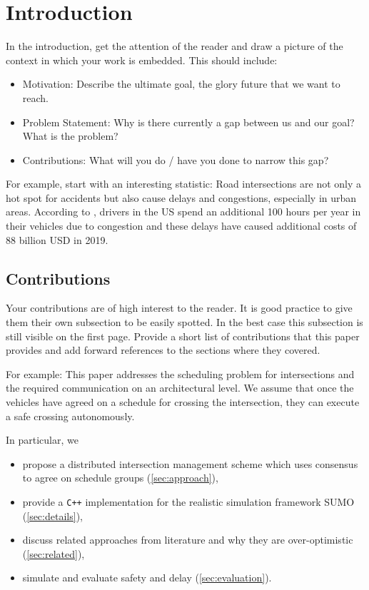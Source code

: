 \section{Introduction}\label{sec:introduction}

In the introduction, get the attention of the reader and draw a picture of the context in which your work is embedded. This should include:

\begin{itemize}
    \item Motivation: Describe the ultimate goal, the glory future that we want to reach.
    \item Problem Statement: Why is there currently a gap between us and our goal? What is the problem?
    \item Contributions: What will you do / have you done to narrow this gap?
\end{itemize}

For example, start with an interesting statistic:
Road intersections are not only a hot spot for accidents but also cause delays and congestions, especially in urban areas.
According to \cite{stau}, drivers in the US spend an additional 100 hours per year in their vehicles due to congestion and these delays have caused additional costs of 88 billion USD in 2019.





\subsection{Contributions}\label{sec:contributions}
Your contributions are of high interest to the reader. It is good practice to give them their own subsection to be easily spotted. In the best case this subsection is still visible on the first page.
Provide a short list of contributions that this paper provides and add forward references to the sections where they covered. 

For example: This paper addresses the scheduling problem for intersections and the required communication on an architectural level. We assume that once the vehicles have agreed on a schedule for crossing the intersection, they can execute a safe crossing autonomously.

In particular, we
\begin{itemize}
    \item propose a distributed intersection management scheme which uses consensus to agree on schedule groups (\cref{sec:approach}),%
    \item provide a \texttt{C++} implementation for the realistic simulation framework SUMO (\cref{sec:details}),
    \item discuss related approaches from literature and why they are over-optimistic (\cref{sec:related}),
    \item simulate and evaluate safety and delay (\cref{sec:evaluation}).
\end{itemize}




